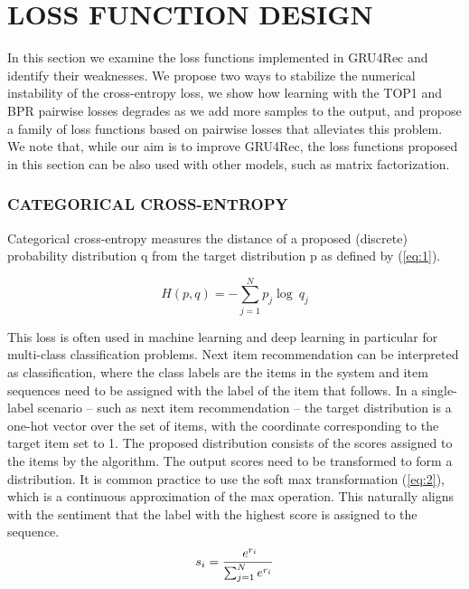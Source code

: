 \chapter{LOSS FUNCTION DESIGN}

\label{sec:loss}
In this section we examine the loss functions implemented in GRU4Rec and identify their weaknesses. We propose two ways to stabilize the numerical instability of the cross-entropy loss, we show how learning with the TOP1 and BPR pairwise losses degrades as we add more samples to the
output, and propose a family of loss functions based on pairwise losses that alleviates this problem.
We note that, while our aim is to improve GRU4Rec, the loss functions proposed in this section can
be also used with other models, such as matrix factorization.

\subsection{ CATEGORICAL CROSS-ENTROPY}
Categorical cross-entropy measures the distance of a proposed (discrete) probability distribution q
from the target distribution p as defined by (\ref{eq:1}).

\begin{equation}\label{eq:1}
   H(p,q)=-\sum_{j=1}^{N} p_j  \log\ q_j
\end{equation}

This loss is often used in machine learning and deep learning in particular for multi-class classification problems. Next item recommendation can be interpreted as classification, where the class labels are the items in the system and item sequences need to be assigned with the label of the item that follows. In a single-label scenario – such as next item recommendation – the target distribution is a one-hot vector over the set of items, with the coordinate corresponding to the target item set
to 1. The proposed distribution consists of the scores assigned to the items by the algorithm. The output scores need to be transformed to form a distribution. It is common practice to use the soft max transformation (\ref{eq:2}), which is a continuous approximation of the max operation. This naturally aligns
with the sentiment that the label with the highest score is assigned to the sequence.
\begin{equation}\label{eq:2}
    s_i = \frac{\ e^{r_i} }{\sum_{j=1}^{N} \\ e^{r_i}}
\end{equation}

